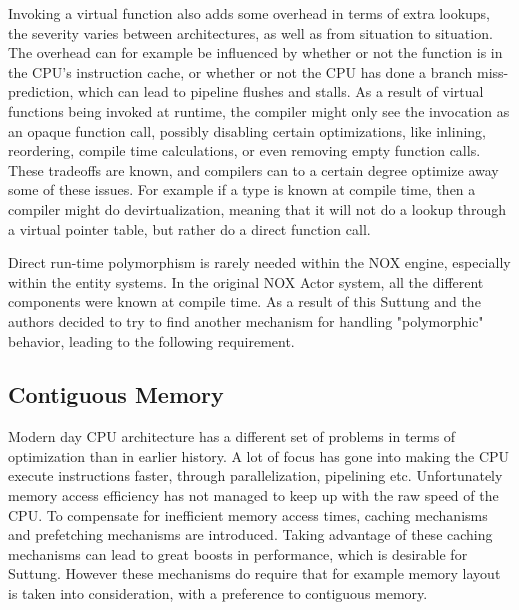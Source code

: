Invoking a virtual function also adds some overhead in terms of extra lookups, the severity varies between architectures,
as well as from situation to situation.
The overhead can for example be influenced by whether or not the function is in the CPU's instruction cache,
or whether or not the CPU has done a branch miss-prediction, which can lead to pipeline flushes and stalls\cite{scott_meyers_cpu_caches_and_why_you_care}\cite[Data Locality]{game_programming_patterns}.
As a result of virtual functions being invoked at runtime, the compiler might only see the invocation as an opaque function call,
possibly disabling certain optimizations, like inlining, reordering, compile time calculations, or even removing empty function calls. 
These tradeoffs are known, and compilers can to a certain degree optimize away some of these issues.
For example if a type is known at compile time, then a compiler might do devirtualization,
meaning that it will not do a lookup through a virtual pointer table, but rather do a direct function call\cite{lazarenko_devirtualization}.

Direct run-time polymorphism is rarely needed within the NOX engine, especially within the entity systems.
In the original NOX Actor system, all the different components were known at compile time.
As a result of this Suttung and the authors decided to try to find another mechanism for handling "polymorphic" behavior,
leading to the following requirement.


\subsection{Contiguous Memory}
\label{subsec:requirements_performance_contiguous_memory}
Modern day CPU architecture has a different set of problems in terms of optimization than in earlier history.
A lot of focus has gone into making the CPU execute instructions faster, through parallelization, pipelining etc.
Unfortunately memory access efficiency has not managed to keep up with the raw speed of the CPU.
To compensate for inefficient memory access times, caching mechanisms and prefetching mechanisms are introduced\cite[p. 153]{game_engine_architecture}.
Taking advantage of these caching mechanisms can lead to great boosts in performance, which is desirable for Suttung.
However these mechanisms do require that for example memory layout is taken into consideration, with a preference
to contiguous memory.

